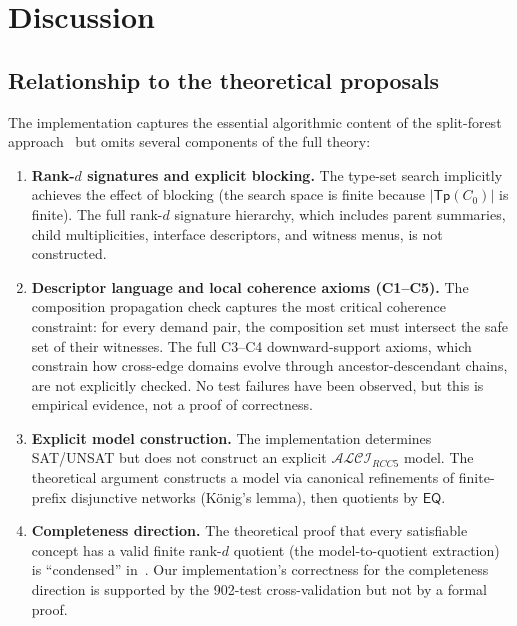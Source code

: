 \documentclass[a4paper,11pt]{article}
\theoremstyle{definition}
\newcommand{\ALCIRCC}[1]{\ensuremath{\mathcal{ALCI}_{\mathit{RCC#1}}}}
\newcommand{\EQ}{\ensuremath{\mathsf{EQ}}}
\newcommand{\Tp}{\ensuremath{\mathsf{Tp}}}
\begin{document}
\section{Discussion}
\label{sec:discussion}

\subsection{Relationship to the theoretical proposals}

The implementation captures the essential algorithmic content
of the split-forest approach~\cite{SiblingCompleted,CoverTree}
but omits several components of the full theory:

\begin{enumerate}[label=(\roman*)]
  \item \textbf{Rank-$d$ signatures and explicit blocking.}
    The type-set search implicitly achieves the effect of blocking
    (the search space is finite because $|\Tp(C_0)|$ is finite).
    The full rank-$d$ signature hierarchy, which includes parent
    summaries, child multiplicities, interface descriptors, and
    witness menus, is not constructed.

  \item \textbf{Descriptor language and local coherence axioms
    (C1--C5).}
    The composition propagation check captures the most critical
    coherence constraint: for every demand pair, the composition
    set must intersect the safe set of their witnesses.
    The full C3--C4 downward-support axioms, which constrain how
    cross-edge domains evolve through ancestor-descendant chains,
    are not explicitly checked.  No test failures have been
    observed, but this is empirical evidence, not a proof of
    correctness.

  \item \textbf{Explicit model construction.}
    The implementation determines SAT/UNSAT but does not construct
    an explicit $\ALCIRCC{5}$ model.  The theoretical argument
    constructs a model via canonical refinements of finite-prefix
    disjunctive networks (K\"onig's lemma), then quotients by
    $\EQ$.

  \item \textbf{Completeness direction.}
    The theoretical proof that every satisfiable concept has a
    valid finite rank-$d$ quotient (the model-to-quotient
    extraction) is ``condensed'' in~\cite{SiblingCompleted}.
    Our implementation's correctness for the completeness direction
    is supported by the 902-test cross-validation but not by a
    formal proof.
\end{enumerate}
\end{document}
